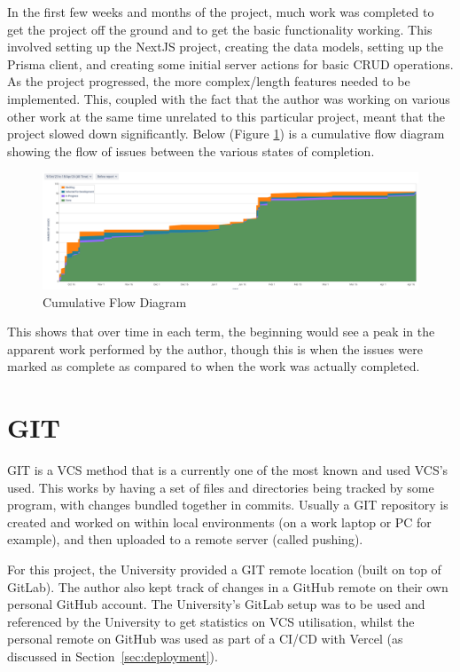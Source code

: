 \documentclass[11pt, a4paper,twoside]{report}
\theoremstyle{plain} %
\theoremstyle{definition} %
\numberwithin{equation}{chapter}
\begin{document}
In the first few weeks and months of the project, much work was completed to
get the project off the ground and to get the basic functionality working. This
involved setting up the NextJS project, creating the data models, setting up
the Prisma client, and creating some initial server actions for basic CRUD
operations. As the project progressed, the more complex/length features needed
to be implemented. This, coupled with the fact that the author was working on
various other work at the same time unrelated to this particular project, meant
that the project slowed down significantly. Below (Figure
\ref{fig:cumm-flow-diag}) is a cumulative flow diagram showing the flow of
issues between the various states of completion.

\begin{figure}[ht]
    \centering
    \includegraphics[width=\textwidth]{cummulative_flow_diagram.png}
    \caption{Cumulative Flow Diagram}\label{fig:cumm-flow-diag}
\end{figure}

This shows that over time in each term, the beginning would see a peak in the
apparent work performed by the author, though this is when the issues were
marked as complete as compared to when the work was actually completed.

\section{GIT}\label{sec:git}

GIT is a VCS method that is a currently one of the most known and used VCS's
used. This works by having a set of files and directories being tracked by some
program, with changes bundled together in commits. Usually a GIT repository is
created and worked on within local environments (on a work laptop or PC for
example), and then uploaded to a remote server (called pushing).

For this project, the University provided a GIT remote location (built on top
of GitLab). The author also kept track of changes in a GitHub remote on their
own personal GitHub account. The University's GitLab setup was to be used and
referenced by the University to get statistics on VCS utilisation, whilst the
personal remote on GitHub was used as part of a CI/CD with Vercel (as
discussed in Section~\ref{sec:deployment}).
\end{document}
